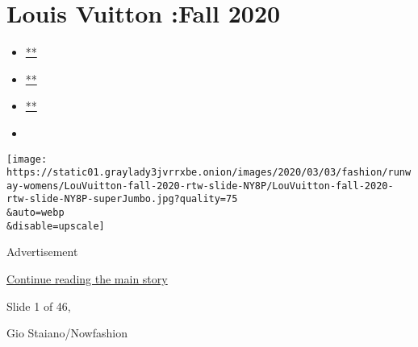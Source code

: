 \hypertarget{louis-vuitton-fall-2020}{%
\section{Louis Vuitton :Fall 2020}\label{louis-vuitton-fall-2020}}

\begin{itemize}
\item
  \href{https://www.facebookcorewwwi.onion/sharer.php?app_id=9869919170\&u=https\%3A\%2F\%2Fwww.nytimes3xbfgragh.onion\%2Fslideshow\%2F2020\%2F03\%2F03\%2Ffashion\%2Frunway-womens\%2Flouis-vuitton-fall-2020.html\%3Fsmid\%3Dfb-share\&name=Louis\%20Vuitton\%20\%3AFall\%202020\&redirect_uri=https\%3A\%2F\%2Fwww.facebookcorewwwi.onion\%2F}{**}
\item
  \href{https://twitter.com/intent/tweet?url=https\%3A\%2F\%2Fwww.nytimes3xbfgragh.onion\%2Fslideshow\%2F2020\%2F03\%2F03\%2Ffashion\%2Frunway-womens\%2Flouis-vuitton-fall-2020.html\%3Fsmid\%3Dtw-share\&text=Louis\%20Vuitton\%20\%3AFall\%202020}{**}
\item
  \href{mailto:?subject=nytimes3xbfgragh.onion\%3A\%20Louis\%20Vuitton\%20\%3AFall\%202020\&body=From\%20The\%20New\%20York\%20Times\%3A\%0A\%0ALouis\%20Vuitton\%20\%3AFall\%202020\%0A\%0ASee\%20the\%20looks\%20from\%20the\%20Louis\%20Vuitton\%3A\%20Fall\%202020\%20Collection.\%0A\%0Ahttps\%3A\%2F\%2Fwww.nytimes3xbfgragh.onion\%2Fslideshow\%2F2020\%2F03\%2F03\%2Ffashion\%2Frunway-womens\%2Flouis-vuitton-fall-2020.html\%3Fsmid\%3Dem-share}{**}
\item
\end{itemize}

\texttt{[image: https://static01.graylady3jvrrxbe.onion/images/2020/03/03/fashion/runway-womens/LouVuitton-fall-2020-rtw-slide-NY8P/LouVuitton-fall-2020-rtw-slide-NY8P-superJumbo.jpg?quality=75\\\&auto=webp\\\&disable=upscale]}

Advertisement

\protect\hyperlink{after-right-0}{Continue reading the main story}

Slide 1 of 46,

Gio Staiano/Nowfashion

